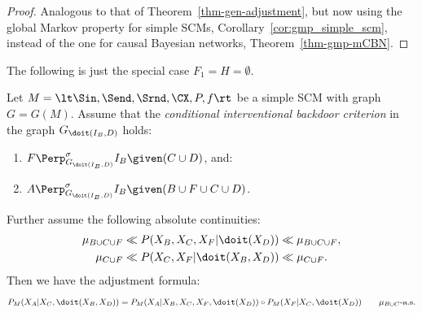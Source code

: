 \begin{proof}
  Analogous to that of Theorem~\ref{thm-gen-adjustment}, but now using
  the global Markov property for simple SCMs, Corollary~\ref{cor:gmp_simple_scm}, 
  instead of the one for causal Bayesian networks, Theorem~\ref{thm-gmp-mCBN}. 
\end{proof}
The following is just the special case $F_1=H=\emptyset$.
\begin{Cor}\label{cor:backdoor-cond-int-scms}
  Let $M = \lt \Sin, \Send, \Srnd, \CX, P, f \rt$ be a simple SCM with graph $G = G(M)$. %
  Assume that the \emph{conditional interventional backdoor criterion} in the graph $G_{\doit(I_B,D)}$ holds:
  \begin{enumerate}
    \item $\displaystyle F \Perp^\sigma_{G_{\doit(I_B,D)}} I_B  \given (C \cup D)$, and:
    \item $\displaystyle A \Perp^\sigma_{G_{\doit(I_B,D)}} I_B  \given (B \cup F \cup C \cup D)$.
  \end{enumerate}
  Further assume the following absolute continuities:
  \begin{align*}
      \mu_{B \cup C \cup F} &\ll  P(X_B,X_C,X_F|\doit(X_D)) \ll \mu_{B \cup C \cup F},\\
      \mu_{C \cup F} &\ll  P(X_C,X_F|\doit(X_B,X_D)) \ll \mu_{C \cup F}.
  \end{align*}
  Then we have the adjustment formula:
  \[ P_{M}(X_A|X_C,\doit(X_B,X_D)) = P_{M}(X_A|X_B,X_C,X_F,\doit(X_D)) \circ P_{M}(X_F|X_C,\doit(X_D)) \qquad \mu_{B \cup C}\text{-a.s.} \]
\end{Cor}

